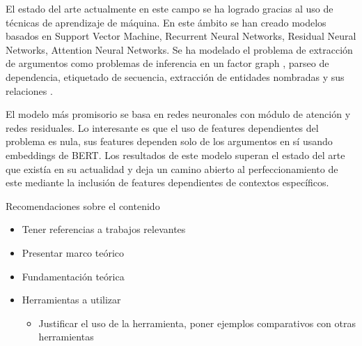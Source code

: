 El estado del arte actualmente en este campo se ha logrado gracias al uso de técnicas de aprendizaje de
máquina. En este ámbito se han creado modelos basados en Support Vector Machine, Recurrent Neural Networks, 
Residual Neural Networks, Attention Neural Networks. Se ha modelado el problema de extracción de argumentos
como problemas de inferencia en un factor graph \cite{niculae2017argument}, parseo de dependencia, etiquetado de
secuencia, extracción de entidades nombradas y sus relaciones \cite{eger2017neural}.

El modelo más promisorio se basa en redes neuronales con módulo de atención y redes residuales. Lo interesante
es que el uso de features dependientes del problema es nula, sus features dependen solo de los argumentos en sí
usando embeddings de BERT. Los resultados de este modelo superan el estado del arte que existía en su actualidad
y deja un camino abierto al perfeccionamiento de este mediante la inclusión de features dependientes de contextos
específicos.

Recomendaciones sobre el contenido
\begin{itemize}
    \item Tener referencias a trabajos relevantes
    \item Presentar marco teórico
    \item Fundamentación teórica
    \item Herramientas a utilizar
    \begin{itemize}
        \item Justificar el uso de la herramienta, poner ejemplos comparativos con otras herramientas
    \end{itemize}
\end{itemize}
